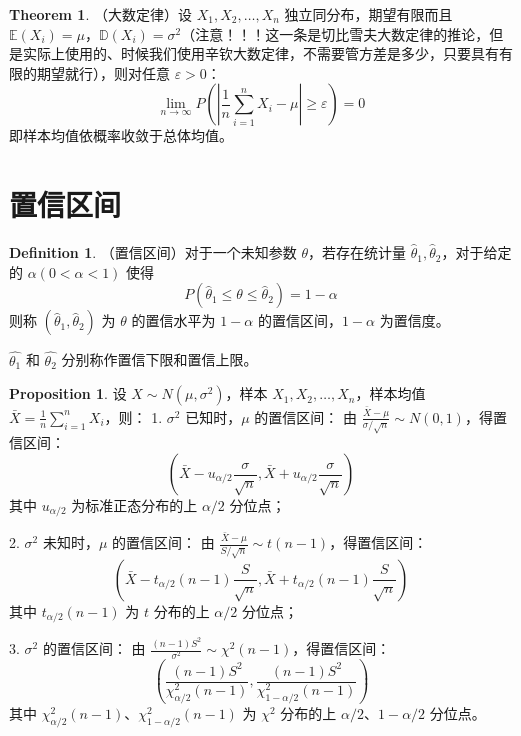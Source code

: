 \documentclass[oneside]{book}
\theoremstyle{definition}
\newtheorem{proposition}{Proposition}[section]
\newtheorem{definition}{Definition}[section]
\newtheorem{theorem}{Theorem}[section]
\begin{document}
	\begin{theorem}
		（大数定律）设 \( X_1,X_2,\dots,X_n \) 独立同分布，期望有限而且 \( \mathbb{E}(X_i) = \mu \)，\( \mathbb{D}(X_i) = \sigma^2 \)（注意！！！这一条是切比雪夫大数定律的推论，但是实际上使用的、时候我们使用辛钦大数定律，不需要管方差是多少，只要具有有限的期望就行），则对任意 \( \varepsilon > 0 \)：
		\[
		\lim_{n\to\infty} P\left( \left| \frac{1}{n}\sum_{i=1}^n X_i - \mu \right| \geq \varepsilon \right) = 0
		\]
		即样本均值依概率收敛于总体均值。
	\end{theorem}
	
	\section{置信区间}
	
	\begin{definition}
		（置信区间）对于一个未知参数 \( \theta \)，若存在统计量 \( \hat{\theta}_1,\hat{\theta}_2 \)，对于给定的 \(\alpha(0<\alpha<1)\) 使得 \[ P(\hat{\theta}_1 \leq \theta \leq \hat{\theta}_2) = 1 - \alpha \]则称 \( (\hat{\theta}_1,\hat{\theta}_2) \) 为 \( \theta \) 的置信水平为 \( 1 - \alpha \) 的置信区间，\( 1 - \alpha \) 为置信度。
	\end{definition}
	\(\hat{\theta_1}\) 和 \(\hat{\theta_2}\) 分别称作置信下限和置信上限。
	\begin{proposition}
		设 \( X \sim N(\mu,\sigma^2) \)，样本 \( X_1,X_2,\dots,X_n \)，样本均值 \( \bar{X} = \frac{1}{n}\sum_{i=1}^n X_i \)，则：
		1. \( \sigma^2 \) 已知时，\( \mu \) 的置信区间：
		由 \( \frac{\bar{X} - \mu}{\sigma/\sqrt{n}} \sim N(0,1) \)，得置信区间：
		\[
		\left( \bar{X} - u_{\alpha/2} \frac{\sigma}{\sqrt{n}}, \bar{X} + u_{\alpha/2} \frac{\sigma}{\sqrt{n}} \right)
		\]
		其中 \( u_{\alpha/2} \) 为标准正态分布的上 \( \alpha/2 \) 分位点；
		
		2. \( \sigma^2 \) 未知时，\( \mu \) 的置信区间：
		由 \( \frac{\bar{X} - \mu}{S/\sqrt{n}} \sim t(n-1) \)，得置信区间：
		\[
		\left( \bar{X} - t_{\alpha/2}(n-1) \frac{S}{\sqrt{n}}, \bar{X} + t_{\alpha/2}(n-1) \frac{S}{\sqrt{n}} \right)
		\]
		其中 \( t_{\alpha/2}(n-1) \) 为 \( t \) 分布的上 \( \alpha/2 \) 分位点；
		
		3. \( \sigma^2 \) 的置信区间：
		由 \( \frac{(n-1)S^2}{\sigma^2} \sim \chi^2(n-1) \)，得置信区间：
		\[
		\left( \frac{(n-1)S^2}{\chi^2_{\alpha/2}(n-1)}, \frac{(n-1)S^2}{\chi^2_{1-\alpha/2}(n-1)} \right)
		\]
		其中 \( \chi^2_{\alpha/2}(n-1) \)、\( \chi^2_{1-\alpha/2}(n-1) \) 为 \( \chi^2 \) 分布的上 \( \alpha/2 \)、\( 1-\alpha/2 \) 分位点。
	\end{proposition}
	
\end{document}
